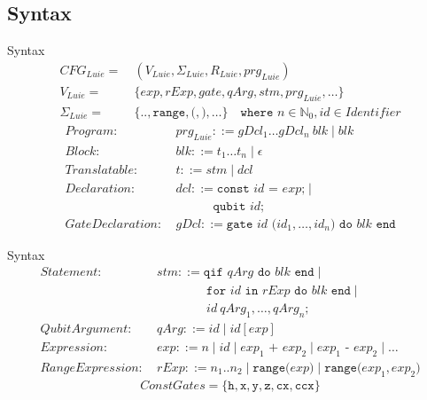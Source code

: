 \subsection{Syntax}
\begin{frame}{Syntax}
    \begin{align*}
        CFG_{Luie} = \ & (V_{Luie}, \Sigma_{Luie}, R_{Luie}, prg_{Luie} )\\ 
        V_{Luie} = \ & \{ exp, rExp, gate,  qArg, stm, prg_{Luie}, \dots \}\\ 
        \Sigma_{Luie} = \ & \{\texttt{..}, \texttt{range}, \texttt{(}, \texttt{)}, \dots \} 
        \quad \texttt{where } n \in \mathbb{N}_0, id \in Identifier
    \end{align*}
    \begin{align*}
        Program: \ & prg_{Luie} ::= gDcl_1 \dots gDcl_n \ blk \mid blk \\
        Block: \ & blk::= t_1 \dots t_n \mid \epsilon\\
        Translatable : \ & t::= stm \mid dcl\\
        Declaration: \ & dcl ::= \texttt{const } id \texttt{ = } exp \texttt{;} \mid \\
                     & \quad \quad \quad \texttt{qubit } id \texttt{;}\\
        GateDeclaration: \ & gDcl::= \texttt{gate } id \texttt{ (}id_1, \dots, id_n\texttt{) do } blk \texttt{ end}
    \end{align*}
\end{frame}

\begin{frame}{Syntax}
    \begin{align*}
        Statement: \ & stm ::= \texttt{qif } qArg \texttt{ do }  blk \texttt{ end} \mid\\
                     & \quad \quad \quad \quad \texttt{for } id \texttt{ in } rExp \texttt{ do } blk \texttt{ end} \mid \\
                     & \quad \quad \quad \quad id \ qArg_1, \dots, qArg_n \texttt{;}\\
        QubitArgument: \ & qArg ::= id \mid id[exp]\\
        Expression: \ & exp ::= n \mid id \mid exp_1 \texttt{ + } exp_2 \mid exp_1 \texttt{ - } exp_2 \mid \dots\\
        RangeExpression: \ & rExp ::= n_1 .. n_2 \mid \texttt{range(} exp \texttt{)} \mid \texttt{range(} exp_1, exp_2 \texttt{)}
    \end{align*}
    \begin{equation*}
        ConstGates = \{\texttt{h}, \texttt{x}, \texttt{y}, \texttt{z}, \texttt{cx}, \texttt{ccx}\}
    \end{equation*}
\end{frame}


